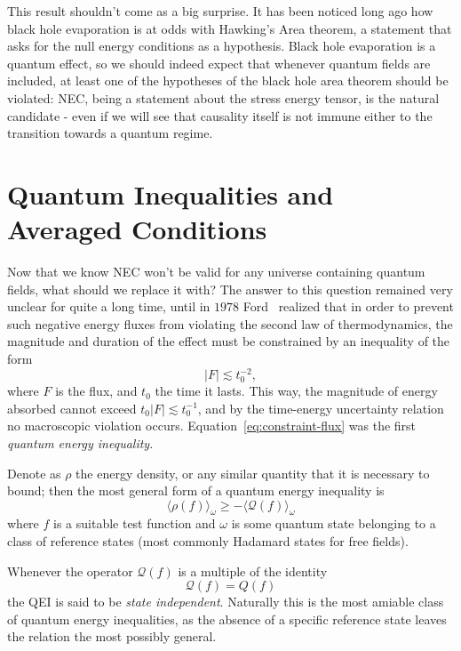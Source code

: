 This result shouldn't come as a big surprise. It has been noticed long ago how black hole evaporation is at odds with Hawking's Area theorem, a statement that asks for the null energy conditions as a hypothesis. Black hole evaporation is a quantum effect, so we should indeed expect that whenever quantum fields are included, at least one of the hypotheses of the black hole area theorem should be violated: NEC, being a statement about the stress energy tensor, is the natural candidate - even if we will see that causality itself is not immune either to the transition towards a quantum regime.

\section[Quantum Averaged Inequalities]{Quantum Inequalities and Averaged Conditions}
Now that we know NEC won't be valid for any universe containing quantum fields, what should we replace it with? The answer to this question remained very unclear for quite a long time, until in \(1978\) Ford~\cite[]{ford1978quantum} realized that in order to prevent such negative energy fluxes from violating the second law of thermodynamics, the magnitude and duration of the effect must be constrained by an inequality of the form
\begin{equation}
    \label{eq:constraint-flux}
    \vert F \vert \lesssim t_0^{-2},    
\end{equation}
where \(F\) is the flux, and \(t_0\) the time it lasts. This way, the magnitude of energy absorbed cannot exceed \(t_0\vert F\vert \lesssim t_0^{-1}\), and by the time-energy uncertainty relation no macroscopic violation occurs. Equation~\eqref{eq:constraint-flux} was the first \emph{quantum energy inequality}. 

Denote as \(\rho\) the energy density, or any similar quantity that it is necessary to bound; then the most general form of a quantum energy inequality is 
\[
\langle \rho(f) \rangle_{\omega} \ge - \langle \mathcal{Q}(f) \rangle_{\omega}   
\]
where \(f\) is a suitable test function and \(\omega\) is some quantum state belonging to a class of reference states (most commonly Hadamard states for free fields).

Whenever the operator \(\mathcal{Q}(f) \) is a multiple of the identity 
\[
    \mathcal{Q}(f) = Q(f)    
\]
the QEI is said to be \emph{state independent}. Naturally this is the most amiable class of quantum energy inequalities, as the absence of a specific reference state leaves the relation the most possibly general.

